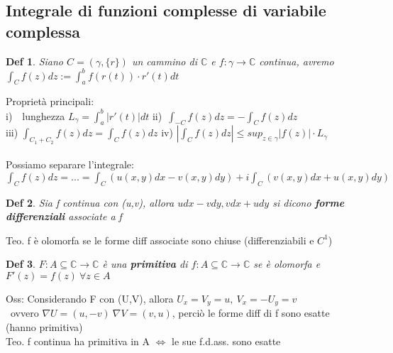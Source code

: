 \documentclass{article}
\theoremstyle{unnumbered}
\newtheorem* {theoremT}{Def}
\theoremstyle{unnumbered1}
\newenvironment{defi}{\begin{gBox}\begin{theoremT}}{\end{theoremT}\end{gBox}}
\begin{document}
\subsection{Integrale di funzioni complesse di variabile complessa}
%
\begin{defi}
Siano $C=(\gamma,\{r\})$ un cammino di $\mathbb{C}$ e $f:\gamma\rightarrow\mathbb{C}$ continua, avremo \ \ $\int_C f(z)dz :=\int_a^b f(r(t))\cdot r'(t)dt $
\end{defi}
%
Proprietà principali:\\
i)\ \ lunghezza $L_{\gamma}=\int_a^b|r'(t)|dt$ \hspace{0.35in} ii)\ $\int_{-C}f(z)dz=-\int_Cf(z)dz$\\
iii) $\int_{C_1+C_2} f(z)dz =\int_{C}f(z)dz$\hspace{0.35in}
iv) $|\int_C f(z)dz| \le sup_{z\in\gamma} |f(z)|\cdot L_{\gamma}$\\ \\
%
Possiamo separare l'integrale: \ $\int_C f(z)dz = ... = \int_C (u(x,y)dx - v(x,y)dy) +i\int_C (v(x,y)dx + u(x,y)dy)$\\
%
%
\begin{defi}
Sia f continua con (u,v), allora $udx-vdy, vdx+udy$ si dicono \textbf{forme differenziali} associate a f
\end{defi}
%
Teo. f è olomorfa se le forme diff associate sono chiuse (differenziabili e $C^1$)\\
%
%
%
%
\begin{defi}
$F:A\subseteq\mathbb{C}\rightarrow\mathbb{C}$ è una \textbf{primitiva} di $f:A\subseteq\mathbb{C}\rightarrow\mathbb{C}$ se  è olomorfa e $F'(z)=f(z) \ \forall z \in A$
\end{defi}
%
Oss: Considerando F con (U,V), allora $U_x=V_y=u, \ V_x=-U_y=v \ $\\\ ovvero $\nabla U=(u,-v) \ \nabla V=(v,u)$, perciò le forme diff di f sono esatte (hanno primitiva)\\
%
Teo. f continua ha primitiva in A $\Longleftrightarrow$ le sue f.d.ass. sono esatte\\ \\
\end{document}
